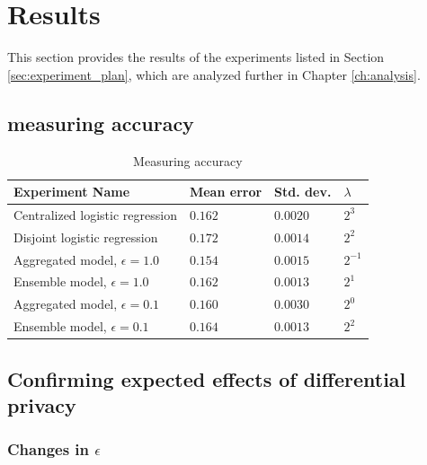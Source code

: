 
\section{Results}
\label{sec:experiment_results}

	This section provides the results of the experiments listed in Section \ref{sec:experiment_plan}, which are analyzed further in Chapter \ref{ch:analysis}.

\subsection{measuring accuracy}

\begin{table}[H]
	\begin{tabular}{|l|l|l|l|}
		\centering
		{\bf Experiment Name}            & {\bf Mean error} & {\bf Std. dev.} & $\lambda$ \\
		\hline
		Centralized logistic regression  & $0.162$          & $0.0020$        & $2^3$     \\
		Disjoint logistic regression     & $0.172$          & $0.0014$        & $2^2$     \\
		Aggregated model, $\epsilon=1.0$ & $0.154$          & $0.0015$        & $2^{-1}$  \\
		Ensemble model, $\epsilon=1.0$   & $0.162$          & $0.0013$        & $2^1$     \\
		Aggregated model, $\epsilon=0.1$ & $0.160$          & $0.0030$        & $2^0$     \\
		Ensemble model, $\epsilon=0.1$   & $0.164$          & $0.0013$        & $2^2$    
	\end{tabular}
	\caption{Measuring accuracy}
	\label{tab:results_measuring_accuracy}
\end{table}

\subsection{Confirming expected effects of differential privacy}
\subsubsection{Changes in $\epsilon$}

